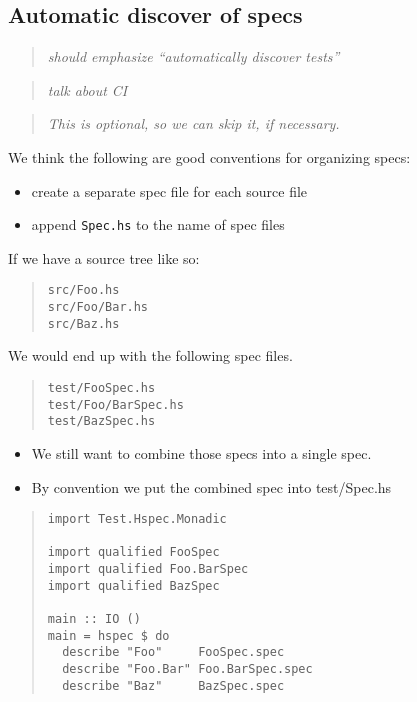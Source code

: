 \documentclass[preprint]{sigplanconf}
\begin{document}
\subsection{Automatic discover of specs}

\begin{quote}
    \emph{should emphasize ``automatically discover tests''}
\end{quote}

\begin{quote}
    \emph{talk about CI}
\end{quote}

\begin{quote}
\emph{This is optional, so we can skip it, if necessary.}
\end{quote}

\noindent We think the following are good conventions for organizing specs:
\begin{itemize}
    \item create a separate spec file for each source file
    \item append {\tt Spec.hs} to the name of spec files
\end{itemize}

\noindent If we have a source tree like so:

\begin{quote}
\small
\begin{verbatim}
src/Foo.hs
src/Foo/Bar.hs
src/Baz.hs
\end{verbatim}
\end{quote}

\noindent We would end up with the following spec files.

\begin{quote}
\small
\begin{verbatim}
test/FooSpec.hs
test/Foo/BarSpec.hs
test/BazSpec.hs
\end{verbatim}
\end{quote}

\begin{itemize}
\item We still want to combine those specs into a single spec.
\item By convention we put the combined spec into test/Spec.hs
\end{itemize}

\begin{quote}
\small
\begin{verbatim}
import Test.Hspec.Monadic

import qualified FooSpec
import qualified Foo.BarSpec
import qualified BazSpec

main :: IO ()
main = hspec $ do
  describe "Foo"     FooSpec.spec
  describe "Foo.Bar" Foo.BarSpec.spec
  describe "Baz"     BazSpec.spec
\end{verbatim}
\end{quote}
\end{document}
